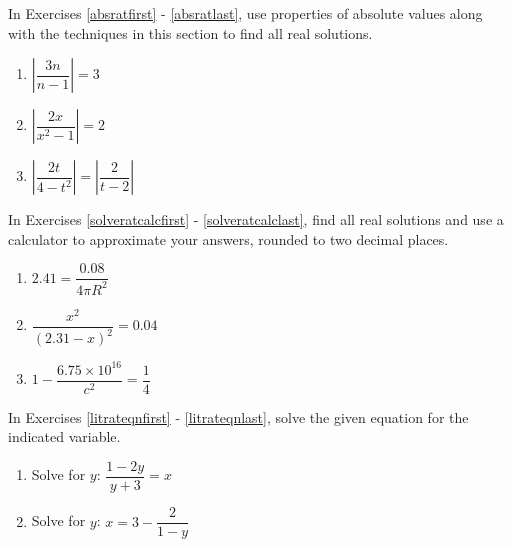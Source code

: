 \documentclass[11pt]{article}
\theoremstyle{definition}  %
\newcounter{HW}
\begin{document}
In Exercises \ref{absratfirst} - \ref{absratlast}, use properties of absolute values along with the techniques in this section to find all real solutions.

\begin{multicols}{3}
\begin{enumerate}
\setcounter{enumi}{\value{HW}}

\item $\left|\dfrac{3n}{n-1}  \right| = 3$ \label{absratfirst}
\item $\left| \dfrac{2x}{x^2-1}\right| = 2$
\item $\left| \dfrac{2t}{4-t^2}\right| = \left|\dfrac{2}{t-2}\right|$ \label{absratlast}

\setcounter{HW}{\value{enumi}}
\end{enumerate}
\end{multicols}


In Exercises \ref{solveratcalcfirst} - \ref{solveratcalclast}, find all real solutions and use a calculator to approximate your answers, rounded to two decimal places.


\begin{multicols}{3}
\begin{enumerate}
\setcounter{enumi}{\value{HW}}


\item $2.41 = \dfrac{0.08}{4 \pi R^2}$ \label{solveratcalcfirst}
\item $\dfrac{x^2}{(2.31 -x)^2} = 0.04$
\item $1 - \dfrac{6.75 \times 10^{16}}{c^2} = \dfrac{1}{4}$ \label{solveratcalclast}

\setcounter{HW}{\value{enumi}}
\end{enumerate}
\end{multicols}


\newpage

In Exercises \ref{litrateqnfirst} - \ref{litrateqnlast}, solve the given equation for the indicated variable.

\begin{multicols}{2}
\begin{enumerate}
\setcounter{enumi}{\value{HW}}


\item Solve for $y$:  $\dfrac{1-2y}{y+3} = x$ \label{litrateqnfirst}

\item Solve for $y$: $x = 3 - \dfrac{2}{1-y}$ 

\setcounter{HW}{\value{enumi}}
\end{enumerate}
\end{multicols}
\end{document}
